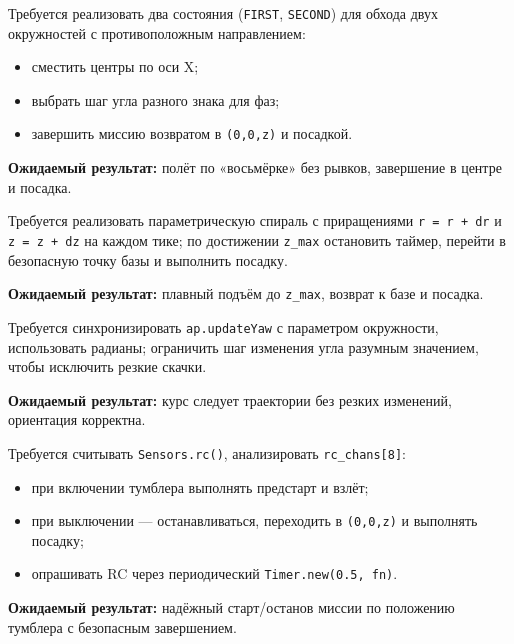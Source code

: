 \begin{taskbox}
Требуется реализовать два состояния (\texttt{FIRST}, \texttt{SECOND}) для обхода двух окружностей с противоположным направлением:
\begin{itemize}
    \item сместить центры по оси X;
    \item выбрать шаг угла разного знака для фаз;
    \item завершить миссию возвратом в \texttt{(0,0,z)} и посадкой.
\end{itemize}

\textbf{Ожидаемый результат:} полёт по «восьмёрке» без рывков, завершение в центре и посадка.
\end{taskbox}

\begin{taskbox}
Требуется реализовать параметрическую спираль с приращениями \texttt{r = r + dr} и \texttt{z = z + dz} на каждом тике; по достижении \texttt{z\_max} остановить таймер, перейти в безопасную точку базы и выполнить посадку.

\textbf{Ожидаемый результат:} плавный подъём до \texttt{z\_max}, возврат к базе и посадка.
\end{taskbox}

\begin{taskbox}
Требуется синхронизировать \texttt{ap.updateYaw} с параметром окружности, использовать радианы; ограничить шаг изменения угла разумным значением, чтобы исключить резкие скачки.

\textbf{Ожидаемый результат:} курс следует траектории без резких изменений, ориентация корректна.
\end{taskbox}

\begin{taskbox}
Требуется считывать \texttt{Sensors.rc()}, анализировать \texttt{rc\_chans[8]}:
\begin{itemize}
    \item при включении тумблера выполнять предстарт и взлёт;
    \item при выключении — останавливаться, переходить в \texttt{(0,0,z)} и выполнять посадку;
    \item опрашивать RC через периодический \texttt{Timer.new(0.5, fn)}.
\end{itemize}

\textbf{Ожидаемый результат:} надёжный старт/останов миссии по положению тумблера с безопасным завершением.
\end{taskbox}

